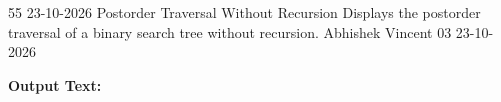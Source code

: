 \clearpage
\label{prog:55}
\programhead
  {55}
  {23-10-2026}
  {Postorder Traversal Without Recursion}
  {Displays the postorder traversal of a binary search tree without recursion.}
  {Abhishek Vincent}
  {03}
  {23-10-2026}

\divider
\textbf{Output Text:}\par
\vspace{2pt}

